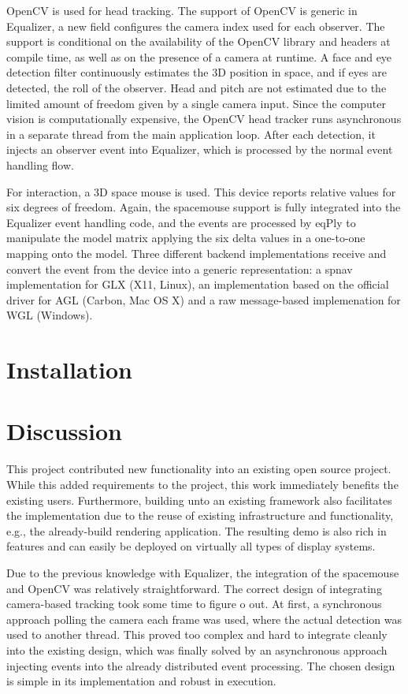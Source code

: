 \documentclass[10pt,a4]{scrartcl}
\newcommand{\fix}[1]{\textbf{\color{red}{#1}}}
\begin{document}
OpenCV is used for head tracking. The support of OpenCV is generic in Equalizer,
a new field configures the camera index used for each observer. The support is
conditional on the availability of the OpenCV library and headers at compile
time, as well as on the presence of a camera at runtime. A face and eye
detection filter continuously estimates the 3D position in space, and if eyes
are detected, the roll of the observer. Head and pitch are not estimated due to
the limited amount of freedom given by a single camera input. Since the computer
vision is computationally expensive, the OpenCV head tracker runs asynchronous
in a separate thread from the main application loop. After each detection, it
injects an observer event into Equalizer, which is processed by the normal event
handling flow.

For interaction, a 3D space mouse is used. This device reports relative values
for six degrees of freedom. Again, the spacemouse support is fully integrated
into the Equalizer event handling code, and the events are processed by
\textsf{eqPly} to manipulate the model matrix applying the six delta values in a
one-to-one mapping onto the model. Three different backend implementations
receive and convert the event from the device into a generic representation: a
\textsf{spnav} implementation for GLX (X11, Linux), an implementation based on
the official driver for AGL (Carbon, Mac OS X) and a raw message-based
implemenation for WGL (Windows).

\fix{Physics:}

\section{Installation}

\section{Discussion}

This project contributed new functionality into an existing open source
project. While this added requirements to the project, this work immediately
benefits the existing users. Furthermore, building unto an existing framework
also facilitates the implementation due to the reuse of existing infrastructure
and functionality, e.g., the already-build rendering application. The resulting
demo is also rich in features and can easily be deployed on virtually all types
of display systems.

Due to the previous knowledge with Equalizer, the integration of the spacemouse
and OpenCV was relatively straightforward. The correct design of integrating
camera-based tracking took some time to figure o out. At first, a synchronous
approach polling the camera each frame was used, where the actual detection was
used to another thread. This proved too complex and hard to integrate cleanly
into the existing design, which was finally solved by an asynchronous approach
injecting events into the already distributed event processing. The chosen
design is simple in its implementation and robust in execution.

\fix{Share your experience. What were the difficulties? What you liked and/or
  disliked while developing this project? What you have learned?}
\end{document}

